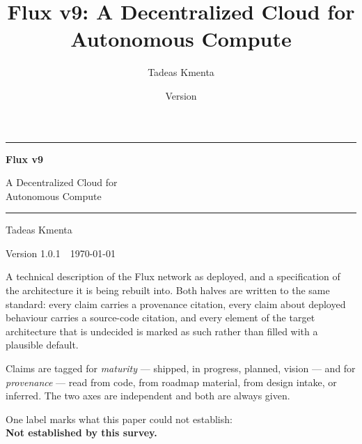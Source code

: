 \documentclass[11pt,a4paper]{article}
\title{\textbf{Flux v9: A Decentralized Cloud for Autonomous Compute}}
\author{Tadeas Kmenta}
\date{Version \paperversion}
\DeclareRobustCommand{\_}{\ifmmode\mbox{\textunderscore}\else\textunderscore\allowbreak\fi}
\newcommand{\paperversion}{1.0.1}
\begin{document}
\begin{titlepage}
\thispagestyle{empty}
\centering
\vspace*{0.16\textheight}

{\color{FluxRule}\rule{\linewidth}{1.4pt}}\par\vspace{1.5em}

{\Huge\bfseries\color{FluxBlue} Flux v9\par}
\vspace{0.65em}
{\LARGE A Decentralized Cloud for\\[0.3em] Autonomous Compute\par}

\vspace{1.5em}
{\color{FluxRule}\rule{\linewidth}{1.4pt}}\par

\vspace{2.2em}
{\large Tadeas Kmenta\par}
\vspace{0.45em}
{\color{FluxSlate}Version \paperversion\ \textperiodcentered\ \today\par}

\vspace{3.2em}
\begin{minipage}{0.90\linewidth}
\small\color{FluxSlate}\setlength{\parskip}{0.75em}
\setlength{\emergencystretch}{2em}
A technical description of the Flux network as deployed, and a specification of the architecture it
is being rebuilt into. Both halves are written to the same standard: every claim carries a
provenance citation, every claim about deployed behaviour carries a source-code citation, and every
element of the target architecture that is undecided is marked as such rather than filled with a
plausible default.

Claims are tagged for \emph{maturity} --- shipped, in progress, planned, vision --- and for
\emph{provenance} --- read from code, from roadmap material, from design intake, or inferred. The
two axes are independent and both are always given.
\end{minipage}

\vfill
{\footnotesize\color{FluxSlate}
One label marks what this paper could not establish:\\[0.35em]
\begingroup\setlength{\fboxsep}{3pt}%
\colorbox{FluxGap!12!white}{\textcolor{FluxGap!62!black}{\textbf{Not established by this survey.}}}%
\endgroup\par}
\vspace{1.2em}
\end{titlepage}
\end{document}
